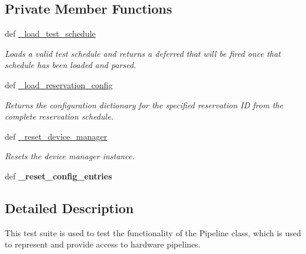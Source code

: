 \subsection*{Private Member Functions}
\begin{DoxyCompactItemize}
\item 
def \hyperlink{classhwm_1_1hardware_1_1pipelines_1_1tests_1_1test__pipeline_1_1_test_pipeline_a709fd1cbc3200ad6af3c4dc6f7646618}{\-\_\-load\-\_\-test\-\_\-schedule}
\begin{DoxyCompactList}\small\item\em Loads a valid test schedule and returns a deferred that will be fired once that schedule has been loaded and parsed. \end{DoxyCompactList}\item 
def \hyperlink{classhwm_1_1hardware_1_1pipelines_1_1tests_1_1test__pipeline_1_1_test_pipeline_a4383fe9d9a0a6b4235c3bd2306cbac90}{\-\_\-load\-\_\-reservation\-\_\-config}
\begin{DoxyCompactList}\small\item\em Returns the configuration dictionary for the specified reservation I\-D from the complete reservation schedule. \end{DoxyCompactList}\item 
def \hyperlink{classhwm_1_1hardware_1_1pipelines_1_1tests_1_1test__pipeline_1_1_test_pipeline_a8e9d8bb9f71f1632a8f7fe3fab3b622e}{\-\_\-reset\-\_\-device\-\_\-manager}
\begin{DoxyCompactList}\small\item\em Resets the device manager instance. \end{DoxyCompactList}\item 
\hypertarget{classhwm_1_1hardware_1_1pipelines_1_1tests_1_1test__pipeline_1_1_test_pipeline_a6ce7f9b04cf67069ba8829e769b71947}{def {\bfseries \-\_\-reset\-\_\-config\-\_\-entries}}\label{classhwm_1_1hardware_1_1pipelines_1_1tests_1_1test__pipeline_1_1_test_pipeline_a6ce7f9b04cf67069ba8829e769b71947}

\end{DoxyCompactItemize}


\subsection{Detailed Description}
This test suite is used to test the functionality of the Pipeline class, which is used to represent and provide access to hardware pipelines. 

